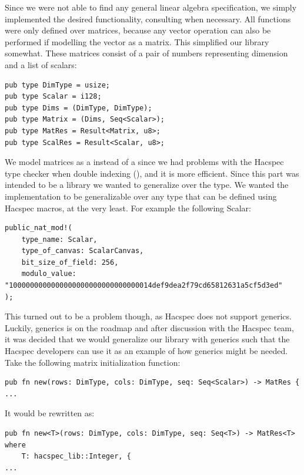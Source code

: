 \documentclass{article}
\newcommand*\ttvar[1]{\texttt{\expandafter\dottvar\detokenize{#1}\relax}}
\newcommand*\dottvar[1]{\ifx\relax#1\else
  \expandafter\ifx\string_#1\string_\allowbreak\else#1\fi
  \expandafter\dottvar\fi}
\begin{document}
Since we were not able to find any general linear algebra
specification, we simply implemented the desired functionality,
consulting \cite{linear-algebra} when necessary. All functions were
only defined over matrices, because any vector operation can also
be performed if modelling the vector as a matrix. This simplified
our library somewhat. These matrices consist of a pair of numbers
representing dimension and a list of scalars:

\begin{lstlisting}
pub type DimType = usize;
pub type Scalar = i128;
pub type Dims = (DimType, DimType);
pub type Matrix = (Dims, Seq<Scalar>);
pub type MatRes = Result<Matrix, u8>;
pub type ScalRes = Result<Scalar, u8>;
\end{lstlisting}

We model matrices as a \ttvar{Seq<Scalar>} instead of a
\ttvar{Seq<Seq<Scalar>>} since we had problems with the Hacspec type
checker when double indexing (\ttvar{list[i][j]}), and it is more
efficient. Since this part was intended to be a library we wanted to
generalize over the \ttvar{Scalar} type. We wanted the implementation to
be generalizable over any type that can be defined using Hacspec
macros, at the very least. For example the following Scalar:

\begin{lstlisting}
public_nat_mod!(
	type_name: Scalar,
	type_of_canvas: ScalarCanvas,
	bit_size_of_field: 256,
	modulo_value: "1000000000000000000000000000000014def9dea2f79cd65812631a5cf5d3ed"
);
\end{lstlisting}

This turned out to be a problem though, as Hacspec does not support
generics. Luckily, generics is on the roadmap and after discussion
with the Hacspec team, it was decided that we would generalize our
library with generics such that the Hacspec developers can use it
as an example of how generics might be needed. Take the following matrix
initialization function:

\begin{lstlisting}
pub fn new(rows: DimType, cols: DimType, seq: Seq<Scalar>) -> MatRes {
...
\end{lstlisting}

It would be rewritten as:

\begin{lstlisting}
pub fn new<T>(rows: DimType, cols: DimType, seq: Seq<T>) -> MatRes<T>
where
	T: hacspec_lib::Integer, {
...
\end{lstlisting}
\end{document}
